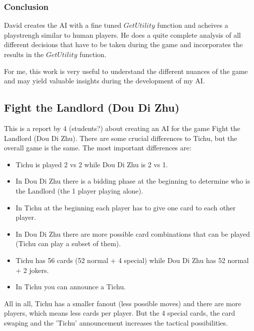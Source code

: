 \documentclass{article}
\begin{document}
\subsubsection*{Conclusion}
David creates the AI with a fine tuned $GetUtility$ function and acheives a playstrengh similar to human players.
He does a quite complete analysis of all different decisions that have to be taken during the game and incorporates the results in the $GetUtility$ function.

For me, this work is very useful to understand the different nuances of the game and may yield valuable insights during the development of my AI.


\subsection{Fight the Landlord (Dou Di Zhu)}
This is a report by 4 (students?) about creating an AI for the game Fight the Landlord (Dou Di Zhu).
There are some crucial differences to Tichu, but the overall game is the same. The most important differences are:
\begin{itemize}
    \item Tichu is played 2 vs 2 while Dou Di Zhu is 2 vs 1.
    \item In Dou Di Zhu there is a bidding phase at the beginning to determine who is the Landlord (the 1 player playing alone).
    \item In Tichu at the beginning each player has to give one card to each other player.
    \item In Dou Di Zhu there are more possible card combinations that can be played (Tichu can play a subset of them).
    \item Tichu has 56 cards (52 normal + 4 special) while Dou Di Zhu has 52 normal + 2 jokers.
    \item In Tichu you can announce a Tichu.
\end{itemize}

All in all, Tichu has a smaller fanout (less possible moves) and there are more players, which means less cards per player.
But the 4 special cards, the card swaping and the 'Tichu' announcement increases the tactical possibilities.
\end{document}
